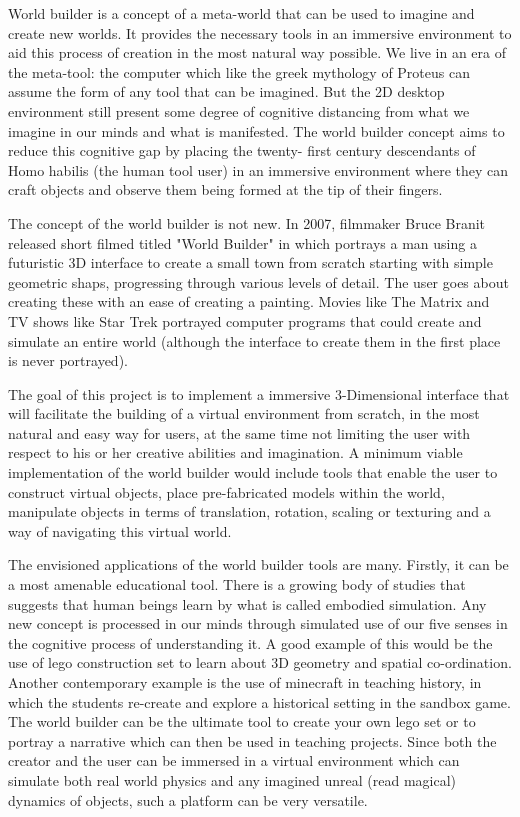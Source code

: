 World builder is a concept of a meta-world that can be used to imagine and create new worlds. It provides the necessary tools in an immersive
environment to aid this process of creation in the most natural way possible. We live in an era of the meta-tool: the computer which like the greek 
mythology of Proteus can assume the form of any tool that can be imagined. But the 2D desktop environment still present some degree of cognitive 
distancing from what we imagine in our minds and what is manifested. The world builder concept aims to reduce this cognitive gap by placing the twenty-
first century descendants of Homo habilis (the human tool user) in an immersive environment where they can craft objects and observe them being formed
at the tip of their fingers.


The concept of the world builder is not new. In 2007, filmmaker Bruce Branit released short filmed titled "World Builder" in which portrays a man using
a futuristic 3D interface to create a small town from scratch starting with simple geometric shaps, progressing through various levels of detail.
The user goes about creating these with an ease of creating a painting. Movies like The Matrix and TV shows like Star Trek portrayed computer programs that
could create and simulate an entire world (although the interface to create them in the first place is never portrayed).


The goal of this project is to implement a immersive 3-Dimensional interface that will facilitate the building of a virtual environment from scratch, in
the most natural and easy way for users, at the same time not limiting the user with respect to his or her creative abilities and imagination. A 
minimum viable implementation of the world builder would include tools that enable the user to construct virtual objects, place pre-fabricated models 
within the world, manipulate objects in terms of translation, rotation, scaling or texturing and a way of navigating this virtual world.



The envisioned applications of the world builder tools are many. Firstly, it can be a most amenable educational tool. There is a growing body of studies 
that suggests that human beings learn by what is called embodied simulation. Any new concept is processed in our minds through simulated use of our five
senses in the cognitive process of understanding it. A good example of this would be the use of lego construction set to learn about 3D geometry and 
spatial co-ordination.  Another contemporary example is the use of minecraft in teaching history, in which the students re-create and explore a 
historical setting in the sandbox game. The world builder can be the ultimate tool to create your own lego set or to portray a narrative which can then
be used in teaching projects. Since both the creator and the user can be immersed in a virtual environment which can simulate both real world physics 
and any imagined unreal (read magical) dynamics of objects, such a platform can be very versatile. 


